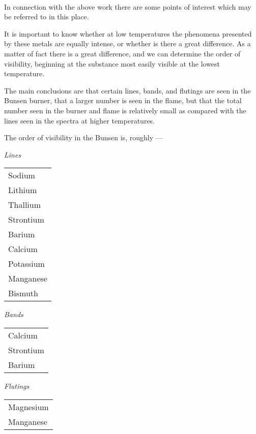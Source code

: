 \documentclass[a4paper, 12pt, oneside, polutonikogreek, english]{article}
\begin{document}
\paragraph{}
In connection with the above work there are some points of interest which may be referred to in this place.

It is important to know whether at low temperatures the phenomena presented by these metals are equally intense, or whether is there a great difference. As a matter of fact there is a great difference, and we can determine the order of visibility, beginning at the substance most easily visible at the lowest temperature.

The main conclusions are that certain lines, bands, and flutings are seen in the Bunsen burner, that a larger number is seen in the flame, but that the total number seen in the burner and flame is relatively small as compared with the lines seen in the spectra at higher temperatures.

The order of visibility in the Bunsen is, roughly ---

\vspace{3mm}

\emph{Lines}
\begin{table}[H]
    \centering
    \begin{tabular}{l}
    Sodium \\
    Lithium \\
    Thallium \\
    Strontium \\
    Barium \\
    Calcium \\
    Potassium \\
    Manganese \\
    Bismuth \\
    \end{tabular}
\end{table}

\emph{Bands}
\begin{table}[H]
    \centering
    \begin{tabular}{l}
    Calcium \\
    Strontium \\
    Barium \\
    \end{tabular}
\end{table}

\emph{Flutings}
\begin{table}[H]
    \centering
    \begin{tabular}{l}
    Magnesium \\
    Manganese \\
    \end{tabular}
\end{table}
\end{document}

